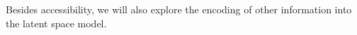 \documentclass[11pt,twoside]{article}
\numberwithin{equation}{section}
\newcommand{\?}{\stackrel{?}{=}}
\begin{document}
Besides accessibility, we will also explore the encoding of other information into the latent space model.






\printbibliography
\end{document}
